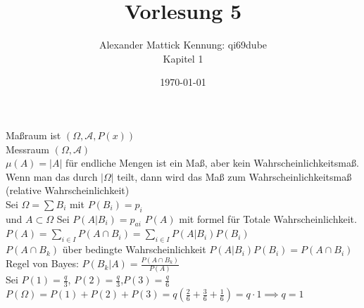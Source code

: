 \documentclass{article}
\author{
Alexander Mattick Kennung: qi69dube\\
Kapitel 1
}
\date{\today}
\title{Vorlesung 5}
\begin{document}
	\maketitle
	Maßraum ist $(\Omega, \mathcal{A},P(x))$\\
	Messraum $(\Omega, \mathcal{A})$\\
	$\mu (A)=|A|$ für endliche Mengen ist ein Maß, aber kein Wahrscheinlichkeitsmaß.\\
	Wenn man das durch $|\Omega|$ teilt, dann wird das Maß zum Wahrscheinlichkeitsmaß (relative Wahrscheinlichkeit)\\
	Sei $\Omega = \sum B_i$ mit $P(B_i)=p_i$\\
	und $A\subset \Omega$ Sei $P(A|B_i) = p_{ai}$
	$P(A)$ mit formel für Totale Wahrscheinlichkeit.\\
	$P(A)=\sum_{i\in I} P(A\cap B_i)=\sum_{i\in I}P(A|B_i)P(B_i)$\\
	$P(A\cap B_k)$ über bedingte Wahrscheinlichkeit $P(A|B_i)P(B_i) = P(A\cap B_i)$\\
	Regel von Bayes: $P(B_k|A) = \frac{P(A\cap B_k)}{P(A)}$\\
	Sei $P(1)=\frac{q}{3}$, $P(2)=\frac{q}{3}$,$P(3)=\frac{q}{6}$\\
	$P(\Omega) = P(1)+P(2)+P(3) = q(\frac{2}{6}+\frac{3}{6}+\frac{1}{6})=q\cdot 1 \implies q=1$\\
\end{document}
